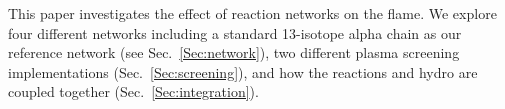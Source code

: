 \documentclass[preprint,times,tighten,linenumbers]{aastex631}
\begin{document}


This paper investigates the effect of reaction networks on the flame.  We explore four different networks including a standard 13-isotope alpha chain as our reference network (see Sec.\ \ref{Sec:network}), two
different plasma screening implementations (Sec.\ \ref{Sec:screening}), and how the reactions and hydro are coupled
together (Sec.\ \ref{Sec:integration}).
\end{document}
